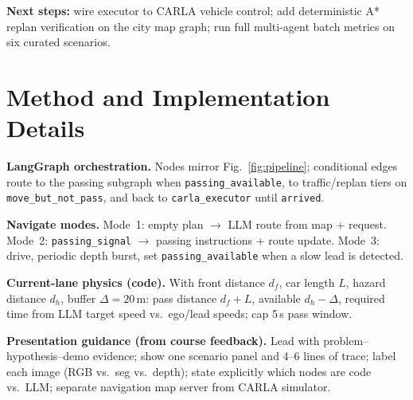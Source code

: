 \documentclass[10pt,twocolumn,letterpaper]{article}
\begin{document}
\textbf{Next steps:} wire executor to CARLA vehicle control; add deterministic A* replan verification on the city map graph; run full multi-agent batch metrics on six curated scenarios.

\section{Method and Implementation Details}
\textbf{LangGraph orchestration.} Nodes mirror Fig.~\ref{fig:pipeline}; conditional edges route to the passing subgraph when \texttt{passing\_available}, to traffic/replan tiers on \texttt{move\_but\_not\_pass}, and back to \texttt{carla\_executor} until \texttt{arrived}.

\textbf{Navigate modes.} Mode~1: empty plan $\rightarrow$ LLM route from map + request. Mode~2: \texttt{passing\_signal} $\rightarrow$ passing instructions + route update. Mode~3: drive, periodic depth burst, set \texttt{passing\_available} when a slow lead is detected.

\textbf{Current-lane physics (code).} With front distance $d_f$, car length $L$, hazard distance $d_h$, buffer $\Delta=20$\,m: pass distance $d_f+L$, available $d_h-\Delta$, required time from LLM target speed vs.\ ego/lead speeds; cap 5\,s pass window.

\textbf{Presentation guidance (from course feedback).} Lead with problem--hypothesis--demo evidence; show one scenario panel and 4--6 lines of trace; label each image (RGB vs.\ seg vs.\ depth); state explicitly which nodes are code vs.\ LLM; separate navigation map server from CARLA simulator.

{\small
\vspace{-4pt}


}
\end{document}
